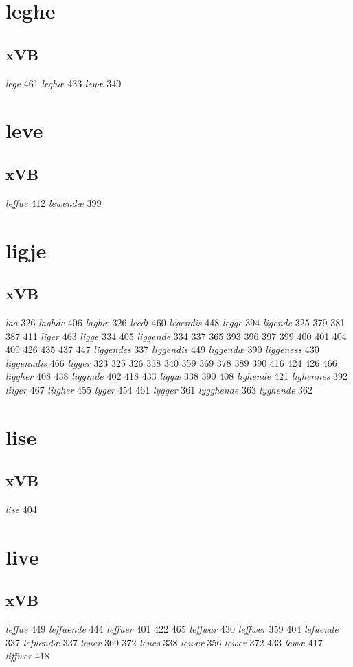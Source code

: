 \documentclass[a4paper,twocolumn]{article}
\begin{document}
\section{leghe}
\label{sec:orgbaa2764}
\subsection{xVB}
\label{sec:org79cd02a}
\emph{lege} 461 \emph{leghæ} 433 \emph{leyæ} 340 
\section{leve}
\label{sec:org9cb4a70}
\subsection{xVB}
\label{sec:org803593d}
\emph{leffue} 412 \emph{lewendæ} 399 
\section{ligje}
\label{sec:orgc671255}
\subsection{xVB}
\label{sec:org8d9de91}
\emph{laa} 326 \emph{laghde} 406 \emph{laghæ} 326 \emph{leedt} 460 \emph{legendis} 448 \emph{legge} 394 \emph{ligende} 325 379 381 387 411 \emph{liger} 463 \emph{ligge} 334 405 \emph{liggende} 334 337 365 393 396 397 399 400 401 404 409 426 435 437 447 \emph{liggendes} 337 \emph{liggendis} 449 \emph{liggendæ} 390 \emph{liggeness} 430 \emph{liggenndis} 466 \emph{ligger} 323 325 326 338 340 359 369 378 389 390 416 424 426 466 \emph{liggher} 408 438 \emph{ligginde} 402 418 433 \emph{liggæ} 338 390 408 \emph{lighende} 421 \emph{lighennes} 392 \emph{liiger} 467 \emph{liigher} 455 \emph{lyger} 454 461 \emph{lygger} 361 \emph{lygghende} 363 \emph{lyghende} 362 
\section{lise}
\label{sec:orgc7b0648}
\subsection{xVB}
\label{sec:orgd4a9595}
\emph{lise} 404 
\section{live}
\label{sec:orgf1997c2}
\subsection{xVB}
\label{sec:org6e61eeb}
\emph{leffue} 449 \emph{leffuende} 444 \emph{leffuer} 401 422 465 \emph{leffwar} 430 \emph{leffwer} 359 404 \emph{lefuende} 337 \emph{lefuendæ} 337 \emph{leuer} 369 372 \emph{leues} 338 \emph{leuær} 356 \emph{lewer} 372 433 \emph{lewæ} 417 \emph{liffwer} 418 
\end{document}
